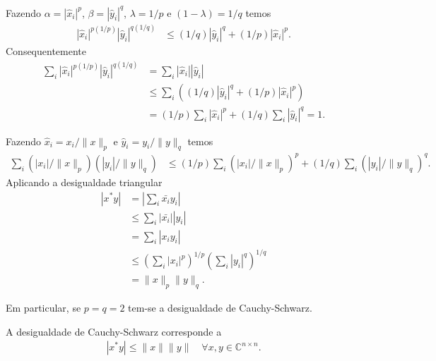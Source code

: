 \begin{questions}
\begin{solution}
        Fazendo $\alpha = | \hat{x}_i |^p$, $\beta = | \hat{y}_i |^q$, $\lambda = 1 / p$ e $(1 - \lambda) = 1 / q$ temos
        \begin{align*}
            | \hat{x}_i |^{p \left( 1 / p \right)} | \hat{y}_i |^{q \left( 1 / q \right)} &\leq \left( 1 / q \right) | \hat{y}_i |^q + \left( 1 / p \right) | \hat{x}_i |^p.
        \end{align*}
        Consequentemente
        \begin{align*}
            \sum_i | \hat{x}_i |^{p \left( 1 / p \right)} | \hat{y}_i |^{q \left( 1 / q \right)} &= \sum_i | \hat{x}_i | | \hat{y}_i | \\
            &\leq \sum_i \left( \left( 1 / q \right) | \hat{y}_i |^q + \left( 1 / p \right) | \hat{x}_i |^p \right) \\
            &= \left( 1 / p \right) \sum_i | \hat{x}_i |^p + \left( 1 / q \right) \sum_i | \hat{y}_i |^q = 1.
        \end{align*}

        Fazendo $\hat{x}_i = x_i / \| x \|_p$ e $\hat{y}_i = y_i / \| y \|_q$ temos
        \begin{align*}
            \sum_i \left( | x_i | / \| x \|_p \right) \left( | y_i | / \| y \|_q \right) &\leq \left( 1 / p \right) \sum_i \left( | x_i | / \| x \|_p \right)^p + \left( 1 / q \right) \sum_i \left( | y_i | / \| y \|_q \right)^q.
        \end{align*}
        Aplicando a desigualdade triangular
        \begin{align*}
            | x^* y | &= \left| \sum_i \bar{x_i} y_i \right| \\
            &\leq \sum_i | \bar{x_i} | | y_i | \\
            &= \sum_i | x_i y_i | \\
            &\leq \left( \sum_i | x_i |^p \right)^{1 / p} \left( \sum_i | y_i |^q \right)^{1 / q} \\
            &= \| x \|_p \| y \|_q.
        \end{align*}
    \end{solution}

    Em particular, se $p = q = 2$ tem-se a desigualdade de Cauchy-Schwarz.
    \begin{solution}
        A desigualdade de Cauchy-Schwarz corresponde a
        \begin{align*}
            | x^* y | \leq \| x \| \| y \| \quad \forall x, y \in \mathbb{C}^{n \times n}.
        \end{align*}
    \end{solution}


\end{questions}
